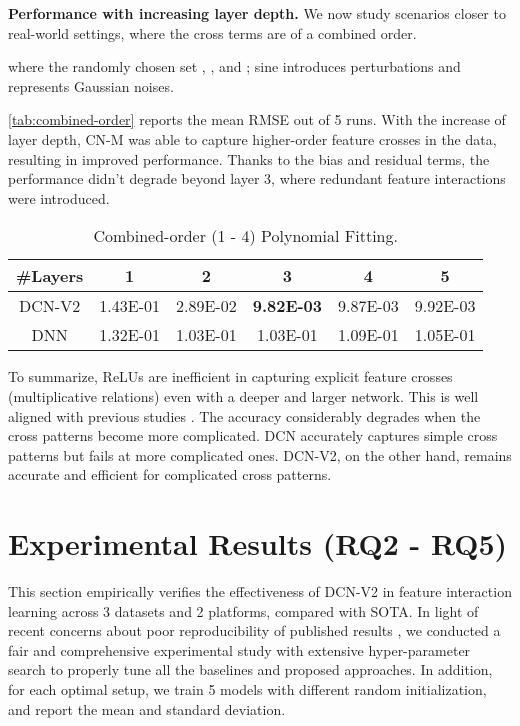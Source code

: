 \documentclass[sigconf]{acmart}
\begin{document}
{\bf Performance with increasing layer depth.} We now study scenarios closer to real-world settings, where the cross terms are of a combined order.  

where the randomly chosen set , , and ; sine introduces perturbations and  represents Gaussian noises.

\autoref{tab:combined-order} reports the mean RMSE out of 5 runs. With the increase of layer depth, CN-M was able to capture higher-order feature crosses in the data, resulting in improved performance. Thanks to the bias and residual terms, the performance didn't degrade beyond layer 3, where redundant feature interactions were introduced. 

\begin{table}[htbp]
\small
\caption{Combined-order (1 - 4) Polynomial Fitting.}
\vspace{-3.ex}
\label{tab:combined-order}
    \begin{subtable}[h]{0.45\textwidth}
        \centering
\begin{tabular}{c|ccccc}
\toprule
{\bf \#Layers} & 1 & 2 & 3 & 4 & 5\\
\midrule
{DCN-V2} & 1.43E-01 & 2.89E-02 & \bf 9.82E-03 & 9.87E-03 & 9.92E-03 \\
DNN& 1.32E-01 & 1.03E-01 & 1.03E-01 &  1.09E-01 & 1.05E-01\\
\bottomrule
\end{tabular}
\end{subtable}
\end{table}

To summarize, ReLUs are inefficient in capturing explicit feature crosses (multiplicative relations) even with a deeper and larger network. This is well aligned with previous studies \cite{beutel2018latent}. The accuracy considerably degrades when the cross patterns become more complicated. DCN accurately captures simple cross patterns but fails at more complicated ones. {DCN-V2}, on the other hand, remains accurate and efficient for complicated cross patterns.

\section{Experimental Results (RQ2 - RQ5)}
\label{sec:exp_public}
This section empirically verifies the effectiveness of {DCN-V2} in feature interaction learning across 3 datasets and 2 platforms, compared with SOTA. In light of recent concerns about poor reproducibility of published results \cite{dacrema2019we, musgrave2020metric, rendle2020neural}, we conducted a fair and comprehensive experimental study with extensive hyper-parameter search to properly tune all the baselines and proposed approaches. In addition, for each optimal setup, we train 5 models with different random initialization, and report the mean and standard deviation. 
\end{document}

